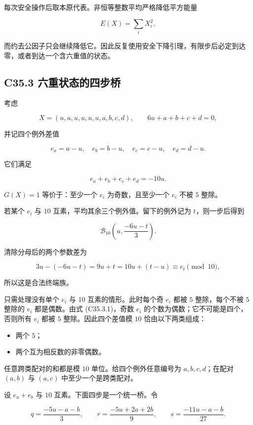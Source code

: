 {每次安全操作后取本原代表。非恒等整数平均严格降低平方能量}

\[
E(X)=\sum_iX_i^2,
\]

{而约去公因子只会继续降低它。因此反复使用安全下降引理，有限步后必定到达零，或者到达一个含六重值的状态。}

\subsection*{\texorpdfstring{{C35.3} {六重状态的四步桥}}{C35.3 六重状态的四步桥}}\label{C35-h235}

{考虑}

\[
X=(u,u,u,u,u,u,a,b,c,d),\qquad 6u+a+b+c+d=0,
\]

{并记四个例外差值}

\[
e_a=a-u,\quad e_b=b-u,\quad e_c=c-u,\quad e_d=d-u.
\]

{它们满足}

\[
e_a+e_b+e_c+e_d=-10u.
\tag{C35.3.1}
\]

\(G(X)=1\) {等价于：至少一个} \(e_i\) {为奇数，且至少一个} \(e_i\) {不被} \(5\) {整除。}

{若某个} \(e_i\) {与} \(10\) {互素，平均其余三个例外值。留下的例外记为} \(t\){，则一步后得到}

\[
\mathcal B_{10}\left(u,\frac{-6u-t}{3}\right).
\]

{清除分母后的两个参数差为}

\[
3u-(-6u-t)=9u+t=10u+(t-u)\equiv e_t\pmod{10},
\]

{所以这是合法终端族。}

{只需处理没有单个} \(e_i\) {与} \(10\) {互素的情形。此时每个奇} \(e_i\) {都被} \(5\) {整除，每个不被} \(5\) {整除的} \(e_i\) {都是偶数。由式} {(C35.3.1)，奇数} \(e_i\) {的个数为偶数；它不可能是四个，否则所有} \(e_i\) {都被} \(5\) {整除。因此四个差值模} \(10\) {恰由以下两类组成：}

\begin{itemize}
\tightlist
\item
  {两个} \(5\){；}
\item
  {两个互为相反数的非零偶数。}
\end{itemize}

{任意跨类配对的和都是模} \(10\) {单位。给四个例外任意编号为} \(a,b,c,d\){；在配对} \((a,b)\) {与} \((a,c)\) {中至少一个是跨类配对。}

{设} \(e_a+e_b\) {与} \(10\) {互素。下面四步是一个统一桥。令}

\[
q=\frac{-5u-a-b}{3},\qquad
r=\frac{-5u+2a+2b}{9},\qquad
s=\frac{-11u-a-b}{27}.
\]

